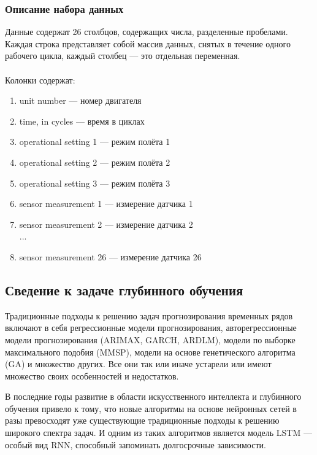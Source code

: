\documentclass[14pt]{extarticle}
\begin{document}
\subsubsection{Описание набора данных}

Данные содержат 26 столбцов, содержащих числа, разделенные пробелами. Каждая строка представляет собой массив данных, снятых в течение одного рабочего цикла, каждый столбец --- это отдельная переменная.
\\
\\
Колонки содержат:
\begin{enumerate} 
	\item unit number --- номер двигателя
	\item time, in cycles --- время в циклах
	\item operational setting 1 --- режим полёта 1
	\item operational setting 2 --- режим полёта 2
	\item operational setting 3 --- режим полёта 3
	\item sensor measurement 1 --- измерение датчика 1	
	\item sensor measurement 2 --- измерение датчика 2
	\\
	...
	\setcounter{enumi}{25}
	\item sensor measurement 26 --- измерение датчика 26
\end{enumerate}

\subsection{Сведение к задаче глубинного обучения} 

Традиционные подходы к решению задач прогнозирования временных рядов включают в себя регрессионные модели прогнозирования, авторегрессионные модели прогнозирования (ARIMAX, GARCH, ARDLM), модели по выборке максимального подобия (MMSP), модели на основе генетического алгоритма (GA) и множество других. Все они так или иначе устарели или имеют множество своих особенностей и недостатков. 

В последние годы развитие в области искусственного интеллекта и глубинного обучения привело к тому, что новые алгоритмы на основе нейронных сетей в разы превосходят уже существующие традиционные подходы к решению широкого спектра задач. И одним из таких алгоритмов является модель LSTM --- особый вид RNN, способный запоминать долгосрочные зависимости. 

\newpage
\end{document}
